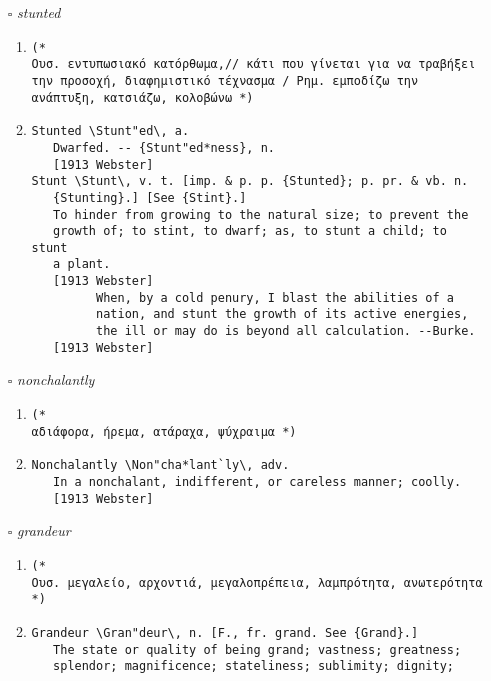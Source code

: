 \documentclass{article}
\begin{document}
\begin{itemize}
\begin{enumerate}
{\begin{lstlisting}
\end{lstlisting}}
\end{enumerate}
\item[$\square$] \emph{ stunted }
\begin{enumerate}
\item{
\begin{lstlisting}
(* 
Ουσ. εντυπωσιακό κατόρθωμα,// κάτι που γίνεται για να τραβήξει την προσοχή, διαφημιστικό τέχνασμα / Ρημ. εμποδίζω την ανάπτυξη, κατσιάζω, κολοβώνω *)
\end{lstlisting}}
\item{
\begin{lstlisting}
Stunted \Stunt"ed\, a.
   Dwarfed. -- {Stunt"ed*ness}, n.
   [1913 Webster]
Stunt \Stunt\, v. t. [imp. & p. p. {Stunted}; p. pr. & vb. n.
   {Stunting}.] [See {Stint}.]
   To hinder from growing to the natural size; to prevent the
   growth of; to stint, to dwarf; as, to stunt a child; to stunt
   a plant.
   [1913 Webster]
         When, by a cold penury, I blast the abilities of a
         nation, and stunt the growth of its active energies,
         the ill or may do is beyond all calculation. --Burke.
   [1913 Webster]
\end{lstlisting}}
\end{enumerate}
\item[$\square$] \emph{ nonchalantly }
\begin{enumerate}
\item{
\begin{lstlisting}
(* 
αδιάφορα, ήρεμα, ατάραχα, ψύχραιμα *)
\end{lstlisting}}
\item{
\begin{lstlisting}
Nonchalantly \Non"cha*lant`ly\, adv.
   In a nonchalant, indifferent, or careless manner; coolly.
   [1913 Webster]
\end{lstlisting}}
\end{enumerate}
\item[$\square$] \emph{ grandeur }
\begin{enumerate}
\item{
\begin{lstlisting}
(* 
Ουσ. μεγαλείο, αρχοντιά, μεγαλοπρέπεια, λαμπρότητα, ανωτερότητα *)
\end{lstlisting}}
\item{
\begin{lstlisting}
Grandeur \Gran"deur\, n. [F., fr. grand. See {Grand}.]
   The state or quality of being grand; vastness; greatness;
   splendor; magnificence; stateliness; sublimity; dignity;

\end{lstlisting}}
\end{enumerate}
\end{itemize}
\end{document}
